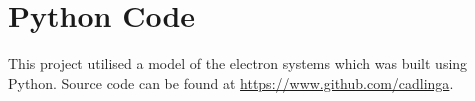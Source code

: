 \chapter{Python Code}

This project utilised a model of the electron systems which was built using Python. Source code can be found at \url{https://www.github.com/cadlinga}. 
% 
